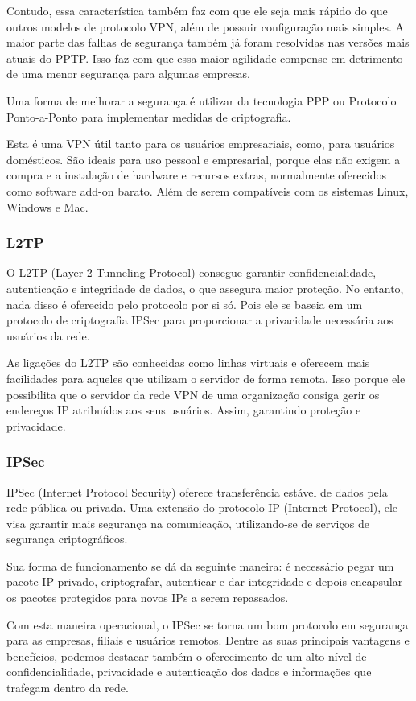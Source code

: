 \documentclass[12pt]{article}
\begin{document}
Contudo, essa característica também faz com que ele seja mais rápido do que outros modelos de protocolo VPN, além de possuir configuração mais simples. A maior parte das falhas de segurança também já foram resolvidas nas versões mais atuais do PPTP. Isso faz com que essa maior agilidade compense em detrimento de uma menor segurança para algumas empresas.

Uma forma de melhorar a segurança é utilizar da tecnologia PPP ou Protocolo Ponto-a-Ponto para implementar medidas de criptografia.

Esta é uma VPN útil tanto para os usuários empresariais, como, para usuários domésticos. São ideais para uso pessoal e empresarial, porque elas não exigem a compra e a instalação de hardware e recursos extras, normalmente oferecidos como software add-on barato. Além de serem compatíveis com os sistemas Linux, Windows e Mac.

\subsubsection{L2TP}
O L2TP (Layer 2 Tunneling Protocol) consegue garantir confidencialidade, autenticação e integridade de dados, o que assegura maior proteção. No entanto, nada disso é oferecido pelo protocolo por si só. Pois ele se baseia em um protocolo de criptografia IPSec para proporcionar a privacidade necessária aos usuários da rede.

As ligações do L2TP são conhecidas como linhas virtuais e oferecem mais facilidades para aqueles que utilizam o servidor de forma remota. Isso porque ele possibilita que o servidor da rede VPN de uma organização consiga gerir os endereços IP atribuídos aos seus usuários. Assim, garantindo proteção e privacidade.

\subsubsection{IPSec}
IPSec (Internet Protocol Security) oferece transferência estável de dados pela rede pública ou privada. Uma extensão do protocolo IP (Internet Protocol), ele visa garantir mais segurança na comunicação, utilizando-se de serviços de segurança criptográficos. 

Sua forma de funcionamento se dá da seguinte maneira: é necessário pegar um pacote IP privado, criptografar, autenticar e dar integridade e depois encapsular os pacotes protegidos para novos IPs a serem repassados.

Com esta maneira operacional, o IPSec se torna um bom protocolo em segurança para as empresas, filiais e usuários remotos. Dentre as suas principais vantagens e benefícios, podemos destacar também o oferecimento de um alto nível de confidencialidade, privacidade e autenticação dos dados e informações que trafegam dentro da rede.
\end{document}
